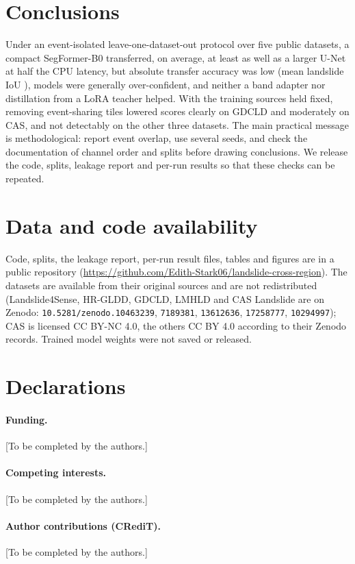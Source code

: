 \documentclass[11pt]{article}
\newcommand{\todo}[1]{{\color{red}[#1]}}
\newcommand{\iou}{IoU}
\begin{document}
\section{Conclusions}
Under an event-isolated leave-one-dataset-out protocol over five public datasets, a compact SegFormer-B0 transferred, on average, at least as well as a larger U-Net at half the CPU latency, but absolute transfer accuracy was low (mean landslide \iou{} \SegIouAllM{}), models were generally over-confident, and neither a band adapter nor distillation from a LoRA teacher helped. With the training sources held fixed, removing event-sharing tiles lowered scores clearly on GDCLD and moderately on CAS, and not detectably on the other three datasets. The main practical message is methodological: report event overlap, use several seeds, and check the documentation of channel order and splits before drawing conclusions. We release the code, splits, leakage report and per-run results so that these checks can be repeated.

\section*{Data and code availability}
Code, splits, the leakage report, per-run result files, tables and figures are in a public repository (\url{https://github.com/Edith-Stark06/landslide-cross-region}). The datasets are available from their original sources and are not redistributed (Landslide4Sense, HR-GLDD, GDCLD, LMHLD and CAS Landslide are on Zenodo: \texttt{10.5281/zenodo.10463239}, \texttt{7189381}, \texttt{13612636}, \texttt{17258777}, \texttt{10294997}); CAS is licensed CC BY-NC 4.0, the others CC BY 4.0 according to their Zenodo records. Trained model weights were not saved or released.

\section*{Declarations}
\paragraph{Funding.} \todo{To be completed by the authors.}
\paragraph{Competing interests.} \todo{To be completed by the authors.}
\paragraph{Author contributions (CRediT).} \todo{To be completed by the authors.}
\end{document}
